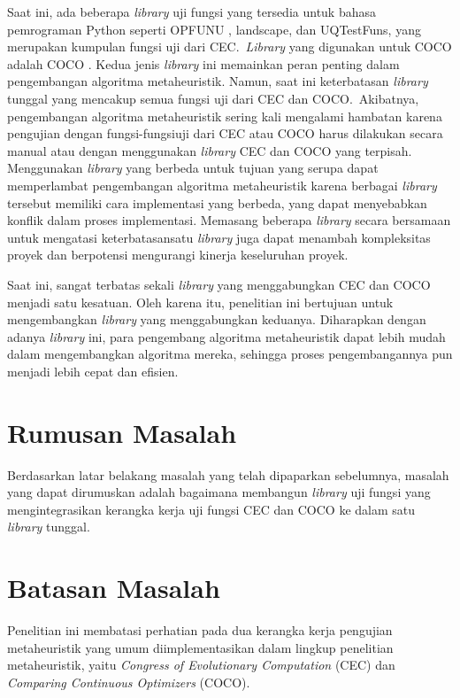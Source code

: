 Saat ini, ada beberapa \textit{library} uji fungsi yang tersedia untuk bahasa pemrograman Python seperti OPFUNU \citep{Van_Thieu_2024}, landscape, dan UQTestFuns, yang merupakan kumpulan fungsi uji dari CEC.\ \textit{Library} yang digunakan untuk COCO adalah COCO \citep{pro_1999}. Kedua jenis \textit{library} ini memainkan peran penting dalam pengembangan algoritma metaheuristik. Namun, saat ini keterbatasan \textit{library} tunggal yang mencakup semua fungsi uji dari CEC dan COCO.\ Akibatnya, pengembangan algoritma metaheuristik sering kali mengalami hambatan karena pengujian dengan fungsi-fungsiuji dari CEC atau COCO harus dilakukan secara manual atau dengan menggunakan \textit{library} CEC dan COCO yang terpisah. Menggunakan \textit{library} yang berbeda untuk tujuan yang serupa dapat memperlambat pengembangan algoritma metaheuristik karena berbagai \textit{library} tersebut memiliki cara implementasi yang berbeda, yang dapat menyebabkan konflik dalam proses implementasi. Memasang beberapa \textit{library} secara bersamaan untuk mengatasi keterbatasansatu \textit{library} juga dapat menambah kompleksitas proyek dan berpotensi mengurangi kinerja keseluruhan proyek.

Saat ini, sangat terbatas sekali \textit{library} yang menggabungkan CEC dan COCO menjadi satu kesatuan. Oleh karena itu, penelitian ini bertujuan untuk mengembangkan \textit{library} yang menggabungkan keduanya. Diharapkan dengan adanya \textit{library} ini, para pengembang algoritma metaheuristik dapat lebih mudah dalam mengembangkan algoritma mereka, sehingga proses pengembangannya pun menjadi lebih cepat dan efisien.

\section{Rumusan Masalah}
Berdasarkan latar belakang masalah yang telah dipaparkan sebelumnya, masalah yang dapat dirumuskan adalah bagaimana membangun \textit{library} uji fungsi yang mengintegrasikan kerangka kerja uji fungsi CEC dan COCO ke dalam satu \textit{library} tunggal.

\section{Batasan Masalah}
Penelitian ini membatasi perhatian pada dua kerangka kerja pengujian metaheuristik yang umum diimplementasikan dalam lingkup penelitian metaheuristik, yaitu \textit{Congress of Evolutionary Computation} (CEC) dan \textit{Comparing Continuous Optimizers} (COCO).

